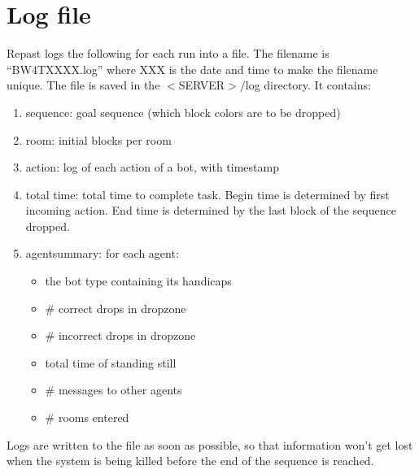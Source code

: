 \documentclass[11pt,a4paper]{article}
\begin{document}
\section{Log file}
Repast logs the following for each run into a file. The filename is “BW4TXXXX.log” where XXX is the date and time to make the filename unique. The file is saved in the $<$SERVER$>/$log directory. It contains:
\begin{enumerate}
\item sequence: goal sequence (which block colors are to be dropped)
\item room: initial blocks per room
\item action: log of each action of a bot, with timestamp 
\item total time: total time to complete task. Begin time is determined by first incoming action. End time is determined by the last block of the sequence dropped.
\item agentsummary: for each agent:
    \begin{itemize}
    \item the bot type containing its handicaps
    \item \# correct drops in dropzone
    \item \# incorrect drops in dropzone
    \item total time of standing still
    \item \# messages to other agents
    \item \# rooms entered
    \end{itemize}
\end{enumerate}
Logs are written to the file as soon as possible, so that information won't get lost when the system is being killed before the end of the sequence is reached.




\end{document}
